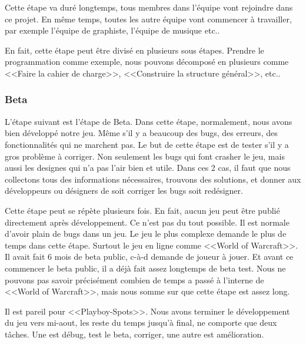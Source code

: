 Cette étape va duré longtemps, tous membres dans l'équipe vont rejoindre dans ce projet. En même temps, toutes les autre équipe vont commencer à travailler, par exemple l'équipe de graphiste, l'équipe de musique etc.. 

En fait, cette étape peut être divisé en plusieurs sous étapes. Prendre le programmation comme exemple, nous pouvons décomposé en plusieurs comme <<Faire la cahier de charge>>, <<Construire la structure général>>, etc..


\subsubsection{Beta} %

L'étape suivant est l'étape de Beta. Dans cette étape, normalement, nous avons bien développé notre jeu. Même s'il y a beaucoup des bugs, des erreurs, des fonctionnalités qui ne marchent pas. Le but de cette étape est de tester s'il y a gros problème à corriger. Non seulement les bugs qui font crasher le jeu, mais aussi les designes qui n'a pas l'air bien et utile. Dans ces 2 cas, il faut que nous collectons tous des informations nécessaires, trouvons des solutions, et donner aux développeurs ou désigners de soit corriger les bugs soit redésigner. 

Cette étape peut se répète plusieurs fois. En fait, aucun jeu peut être publié directement après développement. Ce n'est pas du tout possible. Il est normale d'avoir plain de bugs dans un jeu. Le jeu le plus complexe demande le plus de temps dans cette étape. Surtout le jeu en ligne comme <<World of Warcraft>>. Il avait fait 6 mois de beta public, c-à-d demande de joueur à jouer. Et avant ce commencer le beta public, il a déjà fait assez longtemps de beta test. Nous ne pouvons pas savoir précisément combien de temps a passé à l'interne de <<World of Warcraft>>, mais nous somme sur que cette étape est assez long. 

Il est pareil pour <<Playboy-Spots>>. Nous avons terminer le développement du jeu vers mi-aout, les reste du temps jusqu'à final, ne comporte que deux tâches. Une est débug, test le beta, corriger, une autre est amélioration. 





